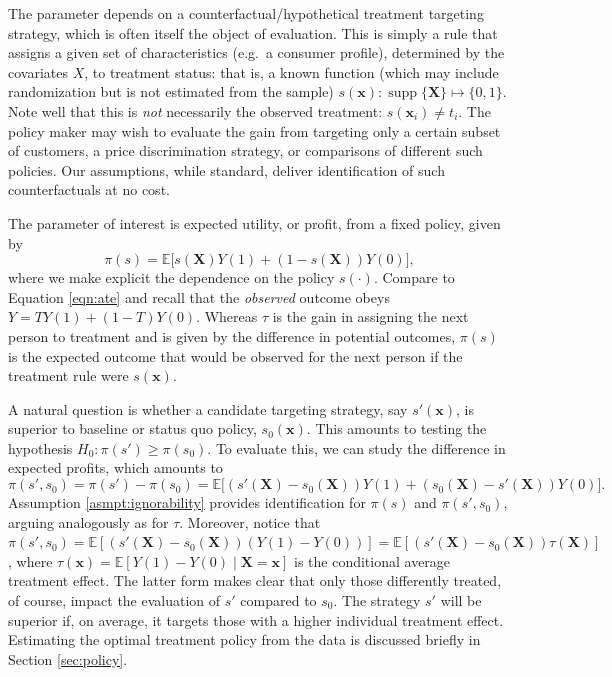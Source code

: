 \documentclass[11pt]{article}
\numberwithin{equation}{section}
\theoremstyle{definition}
\DeclareMathOperator*{\supp}{supp}
\newcommand{\E}{\mathbb{E}}
\newcommand{\bx}{\bm{x}}
\newcommand{\bX}{\bm{X}}
\begin{document}
The parameter depends on a counterfactual/hypothetical treatment targeting strategy, which is often itself the object of evaluation. This is simply a rule that assigns a given set of characteristics (e.g.\ a consumer profile), determined by the covariates $X$, to treatment status: that is, a known function (which may include randomization but is not estimated from the sample) $s(\bx): \supp\{\bX\} \mapsto \{0,1\}$. Note well that this is \emph{not} necessarily the observed treatment: $s(\bx_i) \neq t_i$. The policy maker may wish to evaluate the gain from targeting only a certain subset of customers, a price discrimination strategy, or comparisons of different such policies. Our assumptions, while standard, deliver identification of such counterfactuals at no cost.

The parameter of interest is expected utility, or profit, from a fixed policy, given by
\begin{equation}
	\label{eqn:profit}
	\pi(s) = \E \big[s(\bX)Y(1) + \left(1 - s(\bX)\right) Y(0) \big],
\end{equation}
where we make explicit the dependence on the policy $s(\cdot)$. Compare to Equation \eqref{eqn:ate} and recall that the \emph{observed} outcome obeys $Y = T Y(1) + (1-T)Y(0)$. Whereas $\tau$ is the gain in assigning the next person to treatment and is given by the difference in potential outcomes, $\pi(s)$ is the expected outcome that would be observed for the next person if the treatment rule were $s(\bx)$.


A natural question is whether a candidate targeting strategy, say $s'(\bx)$, is superior to baseline or status quo policy, $s_0(\bx)$. This amounts to testing the hypothesis $H_0: \pi(s') \geq \pi(s_0)$. To evaluate this, we can study the difference in expected profits, which amounts to
\begin{equation}
	\label{eqn:profit diff}
	\pi(s', s_0) = \pi(s') - \pi(s_0) = \E \big[(s'(\bX) - s_0(\bX)) Y(1) + \left(s_0(\bX) - s'(\bX)\right) Y(0) \big] .
\end{equation}
Assumption \ref{asmpt:ignorability} provides identification for $\pi(s)$ and $\pi(s', s_0)$, arguing analogously as for $\tau$. Moreover, notice that $\pi(s', s_0)  = \E [(s'(\bX) - s_0(\bX)) (Y(1) -  Y(0) )] = \E [(s'(\bX) - s_0(\bX)) \tau(\bX)]$, where $\tau(\bx) = \E[Y(1) -  Y(0) \mid \bX = \bx]$ is the conditional average treatment effect. The latter form makes clear that only those differently treated, of course, impact the evaluation of $s'$ compared to $s_0$. The strategy $s'$ will be superior if, on average, it targets those with a higher individual treatment effect. Estimating the optimal treatment policy from the data is discussed briefly in Section \ref{sec:policy}.
\end{document}
